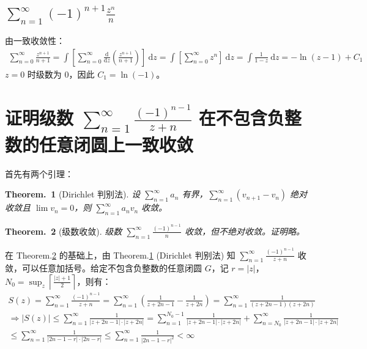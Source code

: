 \documentclass[UTF8]{report}
\theoremstyle{MyLineTheoremStyle} %
\newtheorem{LineTheorem}{Theorem.\,}
\theoremstyle{MyBlockTheoremStyle} %
\theoremstyle{MySubsubsectionStyle} %
\begin{document}
\subsection{$\displaystyle \sum_{n=1}^{\infty} (-1)^{n+1}\frac{z^n}{n}$}
由一致收敛性：
\begin{gather}
    \sum_{n=0}^{\infty} \frac{z^{n+1}}{n+1} 
    = \int \left[ \sum_{n=0}^{\infty}  \frac{\mathrm{d} }{\mathrm{d} z }  \left(\frac{z^{n+1}}{n+1}\right) \right]\ \mathrm{d}z
    = \int \left[  \sum_{n=0}^{\infty} z^n  \right]\ \mathrm{d}z 
    = \int \frac{1}{1 - z} \ \mathrm{d}z
    = - \ln (z - 1) + C_1
\end{gather}
$z = 0$ 时级数为 0，因此 $C_1 = \ln (-1)$。

\section{证明级数 $\sum_{n=1}^{\infty} \frac{(-1)^{n-1}}{z + n}$ 在不包含负整数的任意闭圆上一致收敛}

\noindent 首先有两个引理：

\begin{LineTheorem}[Dirichlet 判别法]\label{Dirichlet 判别法}
    设 $\sum_{n=1}^{\infty} a_n $ 有界，$\sum_{n=1}^{\infty} \left(v_{n+1} - v_{n}\right)$ 绝对收敛且 $\lim v_n = 0$，则 $\sum_{n=1}^{\infty} a_n v_n$ 收敛。
\end{LineTheorem}
\begin{LineTheorem}[级数收敛]\label{级数收敛}
    级数 $\sum_{n=1}^{\infty} \frac{(-1)^{n-1}}{n}$ 收敛，但不绝对收敛。证明略。
\end{LineTheorem}

\noindent 在 Theorem.\ref{级数收敛} 的基础上，由 Theorem.\ref{Dirichlet 判别法} (Dirichlet 判别法) 知 $\sum_{n=1}^{\infty} \frac{(-1)^{n-1}}{z + n}$ 收敛，可以任意加括号。给定不包含负整数的任意闭圆 $G$，记 $r = \left| z \right| $，$N_0 = \sup_z \left \lceil \frac{| z | + 1}{2}  \right \rceil $，则有：
\begin{gather}
S(z) 
= \sum_{n=1}^{\infty} \frac{(-1)^{n-1}}{z + n}
= \sum_{n=1}^{\infty} \left( \frac{1}{z+ 2n -1} - \frac{1}{z + 2n } \right)
= \sum_{n=1}^{\infty} \frac{1}{ (z + 2n -1)(z + 2n) } 
\\
\Longrightarrow  
\left| S(z) \right| 
\leqslant \sum_{n=1}^{\infty} \frac{1}{\left| z + 2n -1 \right|  \cdot \left| z + 2n \right| } 
= \sum_{n=1}^{N_0 - 1} \frac{1}{\left| z + 2n -1 \right|  \cdot \left| z + 2n \right| }  + \sum_{n=N_0}^{\infty} \frac{1}{\left| z + 2n -1 \right|  \cdot \left| z + 2n \right| } 
\\
\leqslant \sum_{n=1}^{\infty} \frac{1}{\left| 2n - 1 -r \right| \cdot \left| 2n - r \right| }
\leqslant \sum_{n=1}^{\infty} \frac{1}{\left| 2n - 1 -r \right|^2} < \infty
\end{gather}
\end{document}
